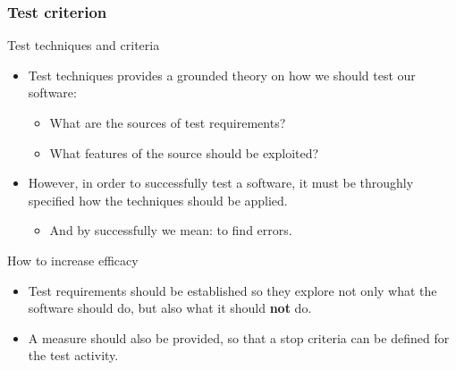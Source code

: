 \begin{frame}[parent={cmap:software-testing-foundations}, hasprev=false, hasnext=true]
\frametitle{Test criterion}

\begin{block:fact}{Test techniques and criteria}
\begin{itemize}
	\item Test techniques provides a grounded theory on how we should test our
	software:
	\begin{itemize}
		\item What are the sources of test requirements?

		\item What features of the source should be exploited?
	\end{itemize}

	\item However, in order to successfully test a software, it must be
	throughly specified how the techniques should be applied.
	\begin{itemize}
		\item And by successfully we mean: to find errors.
	\end{itemize}
\end{itemize}
\end{block:fact}


\begin{block:fact}{How to increase efficacy}
\begin{itemize}
	\item Test requirements should be established so they explore not only
	what the software should do, but also what it should \textbf{not} do.

	\item A measure should also be provided, so that a stop criteria can be
	defined for the test activity.
\end{itemize}
\end{block:fact}
\end{frame}



